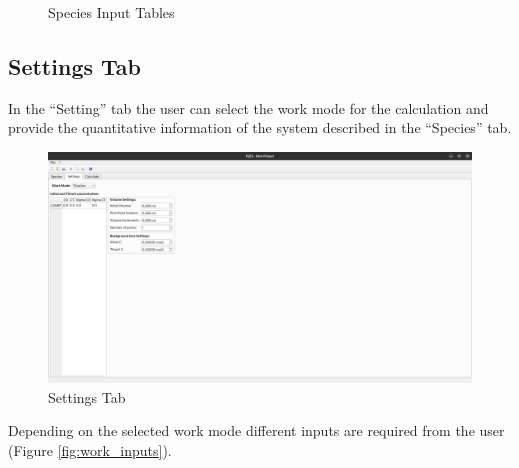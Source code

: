 \documentclass[a4paper, 12pt]{article}
\begin{document}
\begin{figure}[h]
    \centering
    \qquad
    \caption{Species Input Tables}%
    \label{fig:species_tables}%
\end{figure}

\subsection{Settings Tab}
In the ``Setting'' tab the user can select the work mode for the calculation and provide the quantitative information of the system described in the ``Species'' tab.

\begin{figure}[h]
	\centering
	\includegraphics[width=\textwidth]{img/settings.png}
	\caption{Settings Tab}
    \label{fig:settings}
\end{figure}

Depending on the selected work mode different inputs are required from the user (Figure \ref*{fig:work_inputs}).
\end{document}
